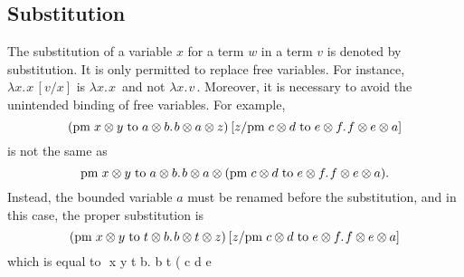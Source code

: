 \subsection{Substitution}
The substitution of a variable $x$ for a term $w$ in a term $v$ is denoted by \gls{substitution}. It is only  permitted  to replace free variables. For instance, $\lambda x. \hspace{1pt} x  \hspace{2pt} [v/x]$ is $\lambda x. \hspace{1pt} x  \hspace{2pt}$ and not  $\lambda x. \hspace{1pt} v  \hspace{2pt}$. Moreover, it is necessary to avoid the unintended binding of free variables. For example, $$(\text{pm} \hspace{3 pt} x \otimes y\hspace{3 pt} \text{to} \hspace{3 pt} a \otimes b. \hspace{1pt} b \otimes a \otimes z) \hspace{2 pt}  [z/\text{pm} \hspace{3 pt} c \otimes d\hspace{3 pt} \text{to} \hspace{3 pt} e \otimes f. \hspace{1pt} f \otimes e \otimes a]$$ is not the same as $$\text{pm} \hspace{3 pt} x \otimes y\hspace{3 pt} \text{to} \hspace{3 pt} a \otimes b. \hspace{1pt} b \otimes a \otimes (\text{pm} \hspace{3 pt} c \otimes d\hspace{3 pt} \text{to} \hspace{3 pt} e \otimes f. \hspace{1pt} f \otimes e \otimes a ). $$ Instead, the bounded variable $a$ must be renamed before the substitution, and in this case, the proper substitution is $$(\text{pm} \hspace{3 pt} x \otimes y\hspace{3 pt} \text{to} \hspace{3 pt} t \otimes b. \hspace{1pt} b \otimes t \otimes z) \hspace{2 pt}  [z/\text{pm} \hspace{3 pt} c \otimes d\hspace{3 pt} \text{to} \hspace{3 pt} e \otimes f. \hspace{1pt} f \otimes e \otimes a]$$ which is equal to $$ \hspace{3 pt} x \otimes y\hspace{3 pt}  \hspace{3 pt} t \otimes b. \hspace{1pt} b \otimes t \otimes ( \hspace{3 pt} c \otimes d\hspace{3 pt}  \hspace{3 pt} e 